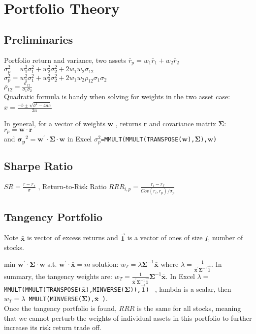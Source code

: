 \section{Portfolio Theory}

\subsection*{Preliminaries}

Portfolio return and variance, two assets
$ \bar{r}_p = w_1 \bar{r}_1 +  w_2 \bar{r}_2 $ \\
$ \sigma_p^2 = w_1^2 \sigma_1^2 + w_2^2 \sigma_2^2 + 2 w_1 w_2 \sigma_{12}  $ \\
$ \sigma_p^2 = w_1^2 \sigma_1^2 + w_2^2 \sigma_2^2 + 2 w_1 w_2 \rho_{12} \sigma_1 \sigma_2  $ \\		
$  \rho_{12} = \frac{\sigma_{12}}{\sigma_1 \sigma_2}$ \\

Quadratic formula is handy when solving for weights in the two asset case:
$x=\frac{-b\pm\sqrt{b^2-4ac}}{2a}$

In general, for a vector of weights $\bm{w}$ , returns $\bm{r}$ and covariance matrix $\bm{\Sigma}$:
$ r_p = \bm{w} \cdotp \bm{r} $ \\ 	and $\bm{ \sigma_p}^2 = \bm{w}^\prime \cdot \bm{\Sigma} \cdot \bm{w} $
in Excel  \texttt{$\sigma_p^2$=MMULT(MMULT(TRANSPOSE($\bm{w}$),$\bm{\Sigma}$),$\bm{w}$)  }


\subsection*{Sharpe Ratio}
$SR = \frac{r-r_f}{\sigma}$ , 
Return-to-Risk Ratio $RRR_{i,p} = \frac{r_i-r_f}{Cov(r_i,r_p)/\sigma_p}$

\subsection*{Tangency Portfolio}
Note $\bm{\bar{x}}$ is vector of excess returns and $\bm{\vec{1}}$ is a vector of ones of size $I$, number of stocks.

min $\bm{w}^\prime \cdot \bm{\Sigma} \cdot \bm{w} $  s.t. $\bm{w}^\prime \cdot \bm{\bar{x}} = m  $ solution: $w_T=\lambda \bm{\Sigma}^{-1} \bm{\bar{x}}$ 
where $\lambda = \frac{1}{\bm{\bar{x}^\prime}  \bm{\Sigma}^{-1}  \bm{\vec{1}}} $. 
In summary, the tangency weights are: $w_T=\frac{1}{\bm{\bar{x}^\prime}  \bm{\Sigma}^{-1}  \bm{\vec{1}}} \bm{\Sigma}^{-1} \bm{\bar{x}}$.
In Excel  \texttt{$\lambda=$MMULT(MMULT(TRANSPOSE($\bm{\bar{x}}$),MINVERSE($\bm{\Sigma}$)),$\bm{\vec{1}}$)  } , lambda is a scalar, 
then \\
\texttt{$w_T=\lambda$ MMULT(MINVERSE($\bm{\Sigma}$),$\bm{\bar{x}}$ )}. \\
Once the tangency portfolio is found, $RRR$ is the same for all stocks, meaning that we cannot perturb the weights of individual assets in this portfolio to further increase its risk return trade off.

